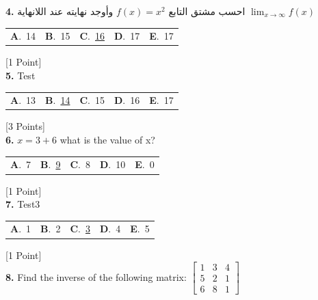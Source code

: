 \documentclass[12pt]{article}
\newcommand{\choice}[2]{\textbf{#1}.~#2}
\begin{document}
\noindent \textbf{\textenglish{4.}} {\textarabic{احسب مشتق التابع }}\( f(x) = x^2\){\textarabic{ وأوجد نهايته عند اللانهاية }}\(\lim_{x \to \infty}f(x)\)

\begin{tabularx}{\linewidth}{@{}*{5}{Y}@{}}
\choice{A}{{{\textenglish{14}}}} & \choice{B}{{{\textenglish{15}}}} & \choice{C}{{\underline{{\textenglish{16}}}}} & \choice{D}{{{\textenglish{17}}}} & \choice{E}{{{\textenglish{17}}}} \\
\end{tabularx}
\hfill {\textenglish{[1 Point]}}\\[0.5em]

\noindent \textbf{\textenglish{5.}} {\textenglish{Test}}

\begin{tabularx}{\linewidth}{@{}*{5}{Y}@{}}
\choice{A}{{{\textenglish{13}}}} & \choice{B}{{\underline{{\textenglish{14}}}}} & \choice{C}{{{\textenglish{15}}}} & \choice{D}{{{\textenglish{16}}}} & \choice{E}{{{\textenglish{17}}}} \\
\end{tabularx}
\hfill {\textenglish{[3 Points]}}\\[0.5em]

\noindent \textbf{\textenglish{6.}} \(x=3+6 \){\textenglish{ what is the value of x?}}

\begin{tabularx}{\linewidth}{@{}*{5}{Y}@{}}
\choice{A}{{{\textenglish{7}}}} & \choice{B}{{\underline{{\textenglish{9}}}}} & \choice{C}{{{\textenglish{8}}}} & \choice{D}{{{\textenglish{10}}}} & \choice{E}{{{\textenglish{0}}}} \\
\end{tabularx}
\hfill {\textenglish{[1 Point]}}\\[0.5em]

\noindent \textbf{\textenglish{7.}} {\textenglish{Test3}}

\begin{tabularx}{\linewidth}{@{}*{5}{Y}@{}}
\choice{A}{{{\textenglish{1}}}} & \choice{B}{{{\textenglish{2}}}} & \choice{C}{{\underline{{\textenglish{3}}}}} & \choice{D}{{{\textenglish{4}}}} & \choice{E}{{{\textenglish{5}}}} \\
\end{tabularx}
\hfill {\textenglish{[1 Point]}}\\[0.5em]

\noindent \textbf{\textenglish{8.}} {\textenglish{Find the inverse of the following matrix: }}\(\begin{bmatrix} 1 & 3 & 4 \\ 5 & 2 & 1 \\ 6 & 8 & 1 \end{bmatrix}\)
\end{document}
